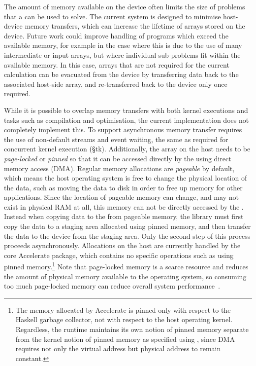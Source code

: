 The amount of memory available on the device often limits the size of problems
that a \GPU can be used to solve. The current system is designed to minimise
host-device memory transfers, which can increase the lifetime of arrays stored
on the device. Future work could improve handling of programs which exceed the
available memory, for example in the case where this is due to the use of many
intermediate or input arrays, but where individual sub-problems fit within the
available memory. In this case, arrays that are not required for the current
calculation can be evacuated from the device by transferring data back to the
associated host-side array, and re-transferred back to the device only once
required.

While it is possible to overlap memory transfers with both kernel executions and
tasks such as compilation and optimisation, the current implementation does not
completely implement this. To support asynchronous memory transfer requires the
use of non-default streams and event waiting, the same as required for
concurrent kernel execution (\S tk). Additionally, the array on the host needs
to be \emph{page-locked} or \emph{pinned} so that it can be accessed directly by
the \GPU using direct memory access (DMA). Regular memory allocations are
\emph{pageable} by default, which means the host operating system is free to
change the physical location of the data, such as moving the data to disk in
order to free up memory for other applications. Since the location of pageable
memory can change, and may not exist in physical RAM at all, this memory can not
be directly accessed by the \GPU@. Instead when copying data to the \GPU from
pageable memory, the \CUDA library must first copy the data to a staging area
allocated using pinned memory, and then transfer the data to the device from the
staging area. Only the second step of this process proceeds asynchronously.
Allocations on the host are currently handled by the core Accelerate package,
which contains no \CUDA specific operations such as using pinned
memory.\footnote{The memory allocated by Accelerate is pinned only with respect
to the Haskell garbage collector, not with respect to the host operating kernel.
Regardless, the \CUDA runtime maintains its own notion of pinned memory
separate from the kernel notion of pinned memory as specified using
, since DMA requires not only the virtual address but physical
address to remain constant.} Note that page-locked memory is a scarce resource
and reduces the amount of physical memory available to the operating system, so
consuming too much page-locked memory can reduce overall system
performance~\cite{NVIDIA:2012wf}.


